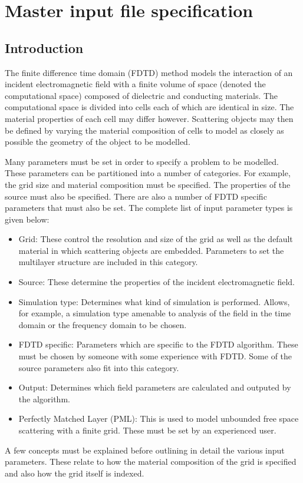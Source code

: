 \documentclass[a4paper, 12pt]{article}
\begin{document}
	\section{Master input file specification}
	\subsection{Introduction}
	The finite difference time domain (FDTD) method models the interaction of an incident electromagnetic
	field with a finite volume of space (denoted the computational space)
	composed of dielectric and conducting materials. The computational
	space is divided into cells each of which are identical in size. The
	material properties of each cell may differ however. Scattering
	objects may then be defined by varying the material composition of
	cells to model as closely as possible the geometry of the object to be modelled.
	
	Many parameters must be set in order to specify a problem to be
	modelled. These parameters can be partitioned into a number of
	categories. For example, the grid size and material composition must
	be specified. The properties of the source must also be
	specified. There are also a number of FDTD specific parameters that must
	also be set. The complete list of input parameter types is given
	below:
	\begin{itemize}
		\item Grid: These control the resolution and size of the
		grid as well as the default material in which scattering objects are
		embedded. Parameters to set the multilayer structure are included in
		this category.
		\item Source: These determine the properties of the incident
		electromagnetic field.
		\item Simulation type: Determines what kind of simulation is
		performed. Allows, for example, a simulation type amenable to
		analysis of the field in the time domain or the frequency domain to
		be chosen.
		\item FDTD specific: Parameters which are specific to the FDTD
		algorithm. These must be chosen by someone with some experience with
		FDTD. Some of the source parameters also fit into this category.
		\item Output: Determines which field parameters are calculated and
		outputed by the algorithm.
		\item Perfectly Matched Layer (PML): This is used to model unbounded
		free space scattering with a finite grid. These must be set by an
		experienced user.
		
	\end{itemize}
	A few concepts must be explained before outlining in detail the
	various input parameters. These relate to how the material composition
	of the grid is specified and also how the grid itself is indexed.
\end{document}

